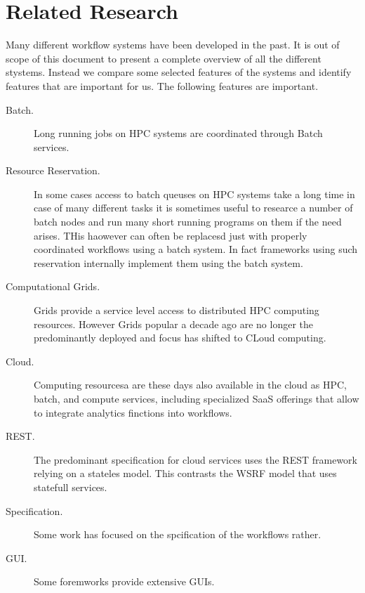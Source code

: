 
\section{Related Research}

Many different workflow systems have been developed in the past.  It
is out of scope of this document to present a complete overview of all
the different stystems. Instead we compare some selected features of
the systems and identify features that are important for us. The
following features are important.

\begin{description}

\item[Batch.] Long running jobs on HPC systems are coordinated through Batch services.

\item[Resource Reservation.] In some cases access to batch queuses on HPC systems take a long time in case of many different tasks it is sometimes useful to researce a number of batch nodes and run many short running programs on them if the need arises. THis haowever can often be replacesd just with properly coordinated workflows using a batch system. In fact frameworks using such reservation internally implement them using the batch system.

\item[Computational Grids.] Grids provide a service level access to distributed HPC computing resources. However Grids popular a decade ago are no longer the predominantly deployed and focus has shifted to CLoud computing. 

\item[Cloud.] Computing resourcesa are these days also available in the cloud as HPC, batch, and compute services, including specialized SaaS offerings that allow to integrate analytics finctions into workflows.

\item[REST.] The predominant specification for cloud services uses the REST framework relying on a stateles model. This contrasts the WSRF model that uses statefull services.

\item[Specification.] Some work has focused on the spcification of the workflows rather.

\item[GUI.] Some foremworks provide extensive GUIs.

\end{description}

